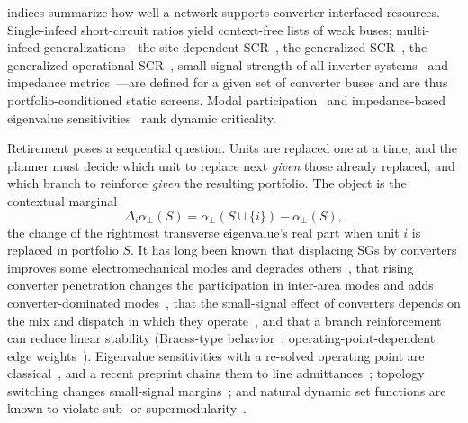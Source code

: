 \documentclass[journal]{IEEEtran}
\theoremstyle{remark}
\newcommand{\aperp}{\alpha_{\perp}}
\begin{document}
 indices summarize how well a network supports
converter-interfaced resources. Single-infeed short-circuit ratios yield
context-free lists of weak buses; multi-infeed generalizations---the
site-dependent SCR~\cite{wu2018sdscr}, the generalized
SCR~\cite{xin2016gscr,dong2019gscr,zhou2023heterogeneous}, the generalized
operational SCR~\cite{liu2024goscr}, small-signal strength of all-inverter
systems~\cite{ma2024strength} and impedance
metrics~\cite{henderson2024gsim,lamrani2025fagim}---are defined for a given set
of converter buses and are thus portfolio-conditioned static screens. Modal
participation~\cite{ebrahimzadeh2018busPF,zhu2022greybox} and impedance-based
eigenvalue sensitivities~\cite{zhu2023rootcause} rank dynamic criticality.

Retirement poses a sequential question. Units are replaced one at a time, and
the planner must decide which unit to replace next \emph{given} those already
replaced, and which branch to reinforce \emph{given} the resulting portfolio. The
object is the contextual marginal
\begin{equation}\label{eq:marg}
\Delta_i\aperp(S)=\aperp(S\cup\{i\})-\aperp(S),
\end{equation}
the change of the rightmost transverse eigenvalue's real part when unit $i$ is
replaced in portfolio $S$. It has long been known that displacing SGs by
converters improves some electromechanical modes and degrades
others~\cite{gautam2009dfig}, that rising converter penetration changes the
participation in inter-area modes and adds converter-dominated
modes~\cite{quintero2014converter}, that the small-signal effect of converters
depends on the mix and dispatch in which they
operate~\cite{li2023intrinsic,markovic2021lowinertia,stanojev2023vim,desai2026dispatch},
and that a branch reinforcement can reduce linear stability
(Braess-type behavior~\cite{coletta2016braess,schafer2022braess};
operating-point-dependent edge weights~\cite{song2018network}). Eigenvalue
sensitivities with a re-solved operating point are
classical~\cite{smed1993feasible,nam2000eigsens,mendozaarmenta2016redispatch,li2019opsens},
and a recent preprint chains them to line admittances~\cite{joswigjones2026sens};
topology switching changes small-signal margins~\cite{saric2015rapid,li2018switching};
and natural dynamic set functions are known to violate
sub- or supermodularity~\cite{summers2016submodularity,olshevsky2018nonsupermodularity,summers2019greedy}.
\end{document}
